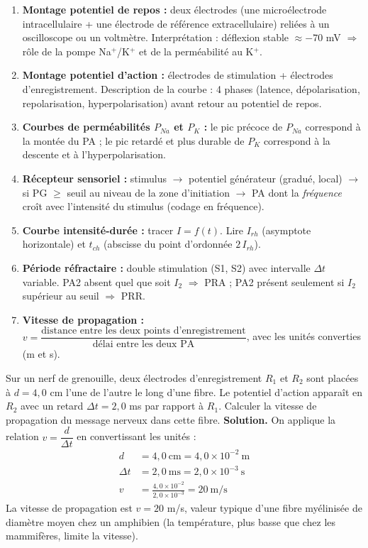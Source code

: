 \documentclass[11pt]{article}
\begin{document}
\begin{methode}
\begin{enumerate}
    \item \textbf{Montage potentiel de repos :} deux électrodes (une microélectrode intracellulaire + une électrode de référence extracellulaire) reliées à un oscilloscope ou un voltmètre. Interprétation : déflexion stable $\approx -70$ mV $\Rightarrow$ rôle de la pompe Na$^+$/K$^+$ et de la perméabilité au K$^+$.
    \item \textbf{Montage potentiel d'action :} électrodes de stimulation + électrodes d'enregistrement. Description de la courbe : 4 phases (latence, dépolarisation, repolarisation, hyperpolarisation) avant retour au potentiel de repos.
    \item \textbf{Courbes de perméabilités $P_{Na}$ et $P_K$ :} le pic précoce de $P_{Na}$ correspond à la montée du PA ; le pic retardé et plus durable de $P_K$ correspond à la descente et à l'hyperpolarisation.
    \item \textbf{Récepteur sensoriel :} stimulus $\to$ potentiel générateur (gradué, local) $\to$ si PG $\ge$ seuil au niveau de la zone d'initiation $\to$ PA dont la \emph{fréquence} croît avec l'intensité du stimulus (codage en fréquence).
    \item \textbf{Courbe intensité-durée :} tracer $I = f(t)$. Lire $I_{rh}$ (asymptote horizontale) et $t_{ch}$ (abscisse du point d'ordonnée $2\,I_{rh}$).
    \item \textbf{Période réfractaire :} double stimulation (S1, S2) avec intervalle $\Delta t$ variable. PA2 absent quel que soit $I_2$ $\Rightarrow$ PRA ; PA2 présent seulement si $I_2$ supérieur au seuil $\Rightarrow$ PRR.
    \item \textbf{Vitesse de propagation :} $v = \dfrac{\text{distance entre les deux points d'enregistrement}}{\text{délai entre les deux PA}}$, avec les unités converties (m et s).
\end{enumerate}
\end{methode}

\begin{exoresolu}
Sur un nerf de grenouille, deux électrodes d'enregistrement $R_1$ et $R_2$ sont placées à $d = 4{,}0$ cm l'une de l'autre le long d'une fibre. Le potentiel d'action apparaît en $R_2$ avec un retard $\Delta t = 2{,}0$ ms par rapport à $R_1$. Calculer la vitesse de propagation du message nerveux dans cette fibre.
\tcblower
\textbf{Solution.} On applique la relation $v = \dfrac{d}{\Delta t}$ en convertissant les unités :
\begin{align*}
d &= 4{,}0~\text{cm} = 4{,}0 \times 10^{-2}~\text{m} \\
\Delta t &= 2{,}0~\text{ms} = 2{,}0 \times 10^{-3}~\text{s} \\
v &= \frac{4{,}0 \times 10^{-2}}{2{,}0 \times 10^{-3}} = 20~\text{m/s}
\end{align*}
La vitesse de propagation est $v = 20$ m/s, valeur typique d'une fibre myélinisée de diamètre moyen chez un amphibien (la température, plus basse que chez les mammifères, limite la vitesse).
\end{exoresolu}
\end{document}
